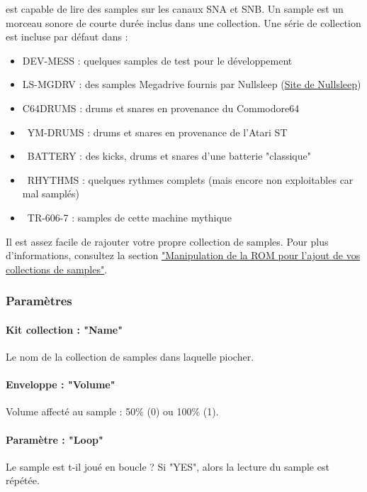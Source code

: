 \FAT est capable de lire des samples sur les canaux SNA et SNB.
Un sample est un morceau sonore de courte durée inclus dans une collection.
Une série de collection est incluse par défaut dans \FAT :\medskip

\begin{itemize}
    \item {DEV-MESS : quelques samples de test pour le développement}
    \item {LS-MGDRV : des samples Megadrive fournis par Nullsleep (\href{http://little-scale.blogspot.fr/2008/08/sega-mega-drive-sample-pack.html}{Site de Nullsleep})}
    \item {C64DRUMS : drums et snares en provenance du Commodore64}
    \item {YM-DRUMS : drums et snares en provenance de l'Atari ST}
    \item {BATTERY : des kicks, drums et snares d'une batterie "classique"}
    \item {RHYTHMS : quelques rythmes complets (mais encore non exploitables car mal samplés)}
    \item {TR-606-7 : samples de cette machine mythique}
\end{itemize} \medskip

Il est assez facile de rajouter votre propre collection de samples. Pour plus d'informations, consultez la section \hyperref[sec:addsamples]{"Manipulation de la ROM pour l'ajout de vos collections de samples"}.


\subsubsection{Paramètres}

\paragraph{Kit collection : "Name"} Le nom de la collection de samples dans laquelle piocher.

\paragraph{Enveloppe : "Volume"} Volume affecté au sample : 50\% (0) ou 100\% (1).

\paragraph{Paramètre : "Loop"} Le sample est t-il joué en boucle ?
                                Si "YES", alors la lecture du sample est répétée.

